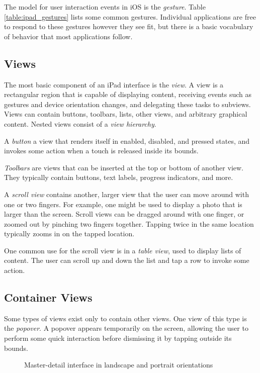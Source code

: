 The model for user interaction events in iOS is the \emph{gesture}. Table
\ref{table:ipad_gestures} lists some common gestures. Individual applications
are free to respond to these gestures however they see fit, but there is a basic
vocabulary of behavior that most applications follow.

\subsection{Views}
\label{sect:ipad_views}

The most basic component of an iPad interface is the \emph{view}. A view is a
rectangular region that is capable of displaying content, receiving events such
as gestures and device orientation changes, and delegating these tasks to
subviews. Views can contain buttons, toolbars, lists, other views, and arbitrary
graphical content. Nested views consist of a \emph{view hierarchy}.

A \emph{button} a view that renders itself in enabled, disabled, and pressed
states, and invokes some action when a touch is released inside its bounds.

\emph{Toolbars} are views that can be inserted at the top or bottom of another
view. They typically contain buttons, text labels, progress indicators, and
more.

A \emph{scroll view} contains another, larger view that the user can move
around with one or two fingers. For example, one might be used to display a
photo that is larger than the screen. Scroll views can be dragged around with
one finger, or zoomed out by pinching two fingers together. Tapping twice in the
same location typically zooms in on the tapped location.

One common use for the scroll view is in a \emph{table view}, used to display
lists of content. The user can scroll up and down the list and tap a row to
invoke some action.

\subsection{Container Views}
\label{sect:ipad_container_views}

Some types of views exist only to contain other views. One view of this type is
the \emph{popover}. A popover appears temporarily on the screen, allowing the
user to perform some quick interaction before dismissing it by tapping outside
its bounds.

\begin{figure}
    \caption{\label{fig:master_detail} Master-detail interface in landscape
    and portrait orientations}
\end{figure}

